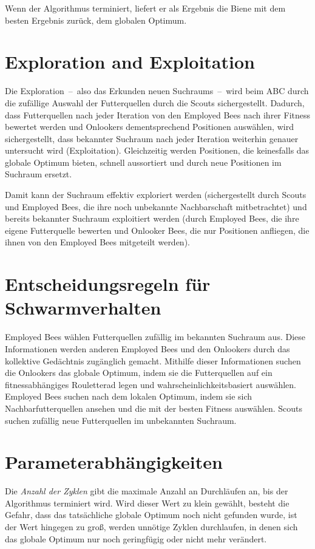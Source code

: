 Wenn der Algorithmus terminiert, liefert er als Ergebnis die Biene mit dem
besten Ergebnis zurück, dem globalen Optimum.

\section{Exploration and Exploitation}

Die Exploration~--~also das Erkunden neuen Suchraums~--~wird beim ABC durch die
zufällige Auswahl der Futterquellen durch die Scouts sichergestellt. Dadurch,
dass Futterquellen nach jeder Iteration von den Employed Bees nach ihrer
Fitness bewertet werden und Onlookers dementsprechend Positionen auswählen,
wird sichergestellt, dass bekannter Suchraum nach jeder Iteration weiterhin
genauer untersucht wird (Exploitation). Gleichzeitig werden Positionen, die
keinesfalls das globale Optimum bieten, schnell aussortiert und durch neue
Positionen im Suchraum ersetzt.

Damit kann der Suchraum effektiv exploriert werden (sichergestellt durch
Scouts und Employed Bees, die ihre noch unbekannte Nachbarschaft mitbetrachtet)
und bereits bekannter Suchraum exploitiert werden (durch Employed Bees, die
ihre eigene Futterquelle bewerten und Onlooker Bees, die nur Positionen
anfliegen, die ihnen von den Employed Bees mitgeteilt werden).

\section{Entscheidungsregeln für Schwarmverhalten}

Employed Bees wählen Futterquellen zufällig im bekannten Suchraum aus. Diese
Informationen werden anderen Employed Bees und den Onlookers durch das
kollektive Gedächtnis zugänglich gemacht.
Mithilfe dieser Informationen suchen die Onlookers das globale Optimum, indem
sie die Futterquellen auf ein fitnessabhängiges Rouletterad legen und
wahrscheinlichkeitsbasiert auswählen.
Employed Bees suchen nach dem lokalen Optimum, indem sie sich
Nachbarfutterquellen ansehen und die mit der besten Fitness auswählen.
Scouts suchen zufällig neue Futterquellen im unbekannten Suchraum.

\section{Parameterabhängigkeiten}

Die \emph{Anzahl der Zyklen} gibt die maximale Anzahl an Durchläufen an, bis
der Algorithmus terminiert wird. Wird dieser Wert zu klein gewählt, besteht
die Gefahr, dass das tatsächliche globale Optimum noch nicht gefunden wurde,
ist der Wert hingegen zu groß, werden unnötige Zyklen durchlaufen, in denen
sich das globale Optimum nur noch geringfügig oder nicht mehr verändert.


